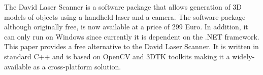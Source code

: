 
The David Laser Scanner \cite{winkelbach:2006} is a software package that
allows generation of 3D models of objects using a handheld laser and a camera.
The software package although originally free, is now available at a price of
299 Euro. In addition, it can only run on Windows since currently it is
dependent on the .NET framework. This paper provides a free alternative to the
David Laser Scanner. It is written in standard C++ and is based on OpenCV and
\ac{3DTK} toolkits \cite{3dtk:2012} making it a widely-available as a
cross-platform solution.
